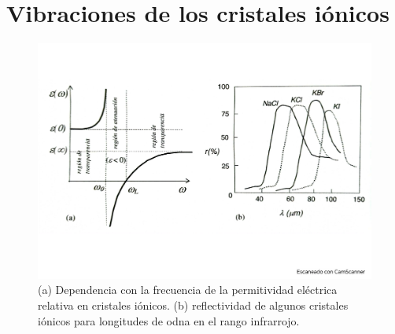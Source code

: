 \section{Vibraciones de los cristales iónicos} \label{Sec:04-04}
\begin{figure}[h!] \centering
    \includegraphics[scale=0.5]{Cuerpo/Ch_04/Fotos libro 8.pdf}
    \caption{(a) Dependencia con la frecuencia de la permitividad eléctrica relativa en cristales iónicos. (b) reflectividad de algunos cristales iónicos para longitudes de odna en el rango infrarrojo.}
    \label{Fig:04-08}
\end{figure}    
